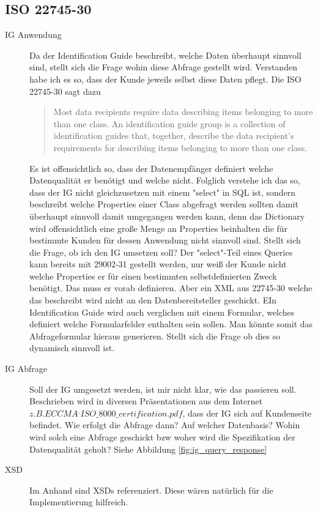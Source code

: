 \subsection{ISO 22745-30}
\begin{description}
\item[IG Anwendung] Da der Identification Guide beschreibt, welche Daten überhaupt sinnvoll sind, stellt sich die Frage wohin diese Abfrage gestellt wird. Verstanden habe ich es so, dass der Kunde jeweils selbst diese Daten pflegt. Die ISO 22745-30 sagt dazu \begin{quote}
Most data recipients require data describing items belonging to more than one class. An identification guide group is a collection of identification guides that, together, describe the data recipient's requirements for describing items belonging to more than one class.
\end{quote} Es ist offensichtlich so, dass der Datenempfänger definiert welche Datenqualität er benötigt und welche nicht. 
Folglich verstehe ich das so, dass der IG nicht gleichzusetzen mit einem "select" in SQL ist, sondern beschreibt welche Properties einer Class abgefragt werden sollten damit überhaupt sinnvoll damit umgegangen werden kann, denn das Dictionary wird offensichtlich eine große Menge an Properties beinhalten die für bestimmte Kunden für dessen Anwendung nicht sinnvoll sind. Stellt sich die Frage, ob ich den IG umsetzen soll? Der "select"-Teil eines Queries kann bereits mit 29002-31 gestellt werden, nur weiß der Kunde nicht welche Properties er für einen bestimmten selbstdefinierten Zweck benötigt. Das muss er vorab definieren. Aber ein XML aus 22745-30 welche das beschreibt wird nicht an den Datenbereitsteller geschickt. 
EIn Identification Guide wird auch verglichen mit einem Formular, welches definiert welche Formularfelder enthalten sein sollen. Man könnte somit das Abfrageformular hieraus generieren. Stellt sich die Frage ob dies so dynamisch sinnvoll ist. 
\item[IG Abfrage] Soll der IG umgesetzt werden, ist mir nicht klar, wie das passieren soll. Beschrieben wird in diversen Präsentationen aus dem Internet \(z.B. ECCMA^\_ISO\_8000\_certification.pdf\), dass der IG sich auf Kundenseite befindet. 
Wie erfolgt die Abfrage dann? Auf welcher Datenbasis? Wohin wird solch eine Abfrage geschickt bzw woher wird die Spezifikation der Datenqualität geholt? Siehe Abbildung \ref{fig:ig_query_response}

\item[XSD] Im Anhand sind XSDs referenziert. Diese wären natürlich für die Implementierung hilfreich.
\end{description}


